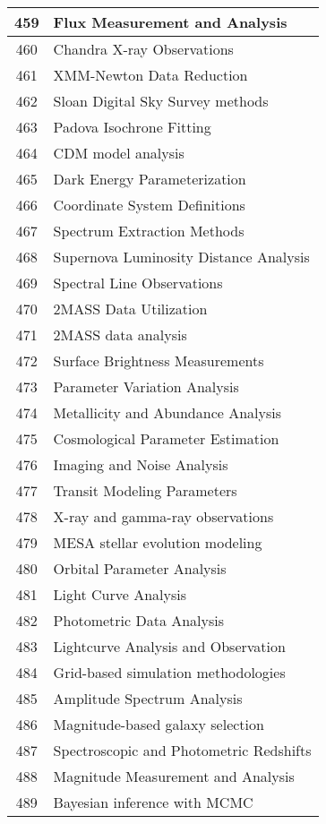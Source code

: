 \begin{table}[htbp]
\begin{tabular}{|c|l|}
459 & Flux Measurement and Analysis \\
\hline
460 & Chandra X-ray Observations \\
\hline
461 & XMM-Newton Data Reduction \\
\hline
462 & Sloan Digital Sky Survey methods \\
\hline
463 & Padova Isochrone Fitting \\
\hline
464 & CDM model analysis \\
\hline
465 & Dark Energy Parameterization \\
\hline
466 & Coordinate System Definitions \\
\hline
467 & Spectrum Extraction Methods \\
\hline
468 & Supernova Luminosity Distance Analysis \\
\hline
469 & Spectral Line Observations \\
\hline
470 & 2MASS Data Utilization \\
\hline
471 & 2MASS data analysis \\
\hline
472 & Surface Brightness Measurements \\
\hline
473 & Parameter Variation Analysis \\
\hline
474 & Metallicity and Abundance Analysis \\
\hline
475 & Cosmological Parameter Estimation \\
\hline
476 & Imaging and Noise Analysis \\
\hline
477 & Transit Modeling Parameters \\
\hline
478 & X-ray and gamma-ray observations \\
\hline
479 & MESA stellar evolution modeling \\
\hline
480 & Orbital Parameter Analysis \\
\hline
481 & Light Curve Analysis \\
\hline
482 & Photometric Data Analysis \\
\hline
483 & Lightcurve Analysis and Observation \\
\hline
484 & Grid-based simulation methodologies \\
\hline
485 & Amplitude Spectrum Analysis \\
\hline
486 & Magnitude-based galaxy selection \\
\hline
487 & Spectroscopic and Photometric Redshifts \\
\hline
488 & Magnitude Measurement and Analysis \\
\hline
489 & Bayesian inference with MCMC \\

\end{tabular}
\end{table}
